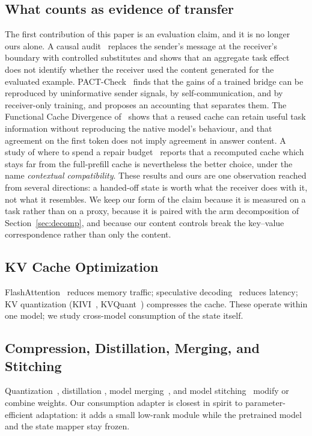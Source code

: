 \documentclass[11pt]{article}
\begin{document}
\subsection{What counts as evidence of transfer}
\label{sec:rw-evidence}
The first contribution of this paper is an evaluation claim, and it is no longer
ours alone.
A causal audit~\cite{latentaudit2026} replaces the sender's message at the
receiver's boundary with controlled substitutes and shows that an aggregate task
effect does not identify whether the receiver used the content generated for the
evaluated example.
PACT-Check~\cite{pactcheck2026} finds that the gains of a trained bridge can be
reproduced by uninformative sender signals, by self-communication, and by
receiver-only training, and proposes an accounting that separates them.
The Functional Cache Divergence of~\cite{funccache2026} shows that a reused cache
can retain useful task information without reproducing the native model's
behaviour, and that agreement on the first token does not imply agreement in
answer content.
A study of where to spend a repair budget~\cite{repairbudget2026} reports that a
recomputed cache which stays far from the full-prefill cache is nevertheless the
better choice, under the name \emph{contextual compatibility}.
These results and ours are one observation reached from several directions: a
handed-off state is worth what the receiver does with it, not what it resembles.
We keep our form of the claim because it is measured on a task rather than on a
proxy, because it is paired with the arm decomposition of
Section~\ref{sec:decomp}, and because our content controls break the key--value
correspondence rather than only the content.

\subsection{KV Cache Optimization}
\label{sec:rw-kvopt}
FlashAttention~\cite{dao2022flashattention} reduces memory traffic; speculative
decoding~\cite{leviathan2023fast,chen2023accelerating} reduces latency; KV
quantization (KIVI~\cite{kivi2024icml}, KVQuant~\cite{kvquant2024nips})
compresses the cache. These operate within one model; we study cross-model
consumption of the state itself.

\subsection{Compression, Distillation, Merging, and Stitching}
\label{sec:rw-merge}
Quantization~\cite{frantar2023gptq,dettmers2024qlora}, distillation
\cite{hinton2015distilling,touvron2023llama}, model
merging~\cite{ties2023merging,dare2024icml}, and model
stitching~\cite{bansal2021stitching} modify or combine weights. Our consumption
adapter is closest in spirit to parameter-efficient adaptation: it adds a small
low-rank module while the pretrained model and the state mapper stay frozen.
\end{document}
